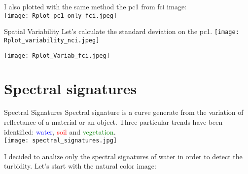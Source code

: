\documentclass{beamer}
\begin{document}
\begin{frame}%
\small{I also plotted with the same method the pc1 from fci image: }\\
\bigskip
\centering
    \texttt{[image: Rplot\_pc1\_only\_fci.jpeg]}\\
\end{frame}

\begin{frame}{Spatial Variability}
\scriptsize{Let's calculate the standard deviation on the pc1. }
\texttt{\tiny{}}
\centering
    \texttt{[image: Rplot\_variability\_nci.jpeg]}
\end{frame}

\begin{frame}
\texttt{\tiny{}}
\centering
    \texttt{[image: Rplot\_Variab\_fci.jpeg]}
\end{frame}

\section{Spectral signatures}
\begin{frame}{Spectral Signatures}
\small{Spectral signature is a curve generate from  the variation of reflectance of a material or an object. Three particular trends have been identified: \textcolor{blue}{water}}, \textcolor{red}{soil} and \textcolor{green}{vegetation}.\\
\bigskip
\centering
\texttt{[image: spectral\_signatures.jpg]}
\end{frame}

\begin{frame}
\small{I decided to analize only the spectral signatures of water in order to detect the turbidity. Let's start with the natural color image: }
\texttt{\tiny{}}
\centering
\end{frame}

\begin{frame}
\texttt{\tiny{}}
\end{frame}
\end{document}
